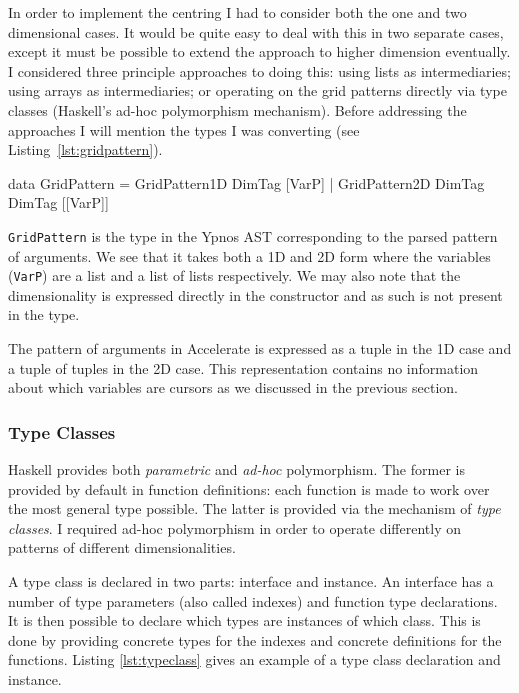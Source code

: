 \documentclass[12pt,a4paper,twoside]{scrbook}
\begin{document}
In order to implement the centring I had to consider both the one and two
dimensional cases.  It would be quite easy to deal with this in two separate
cases, except it must be possible to extend the approach to higher dimension
eventually. I considered three principle approaches to doing this: using lists
as intermediaries; using arrays as intermediaries; or operating on the grid
patterns directly via type classes (Haskell's ad-hoc polymorphism mechanism).
Before addressing the approaches I will mention the types I was converting (see
Listing~\ref{lst:gridpattern}).

\begin{hflisting}[label={lst:gridpattern}, caption=The data type which stores
  the grid patterns in Ypnos. Notice that the dimensionality is not exposed in
  the type.]
data GridPattern =
    GridPattern1D DimTag [VarP] |
    GridPattern2D DimTag DimTag [[VarP]]
\end{hflisting}

\texttt{GridPattern} is the type in the Ypnos AST corresponding to the
parsed pattern of arguments. We see that it takes both a 1D and 2D form
where the variables (\texttt{VarP}) are a list and a list of lists
respectively. We may also note that the dimensionality is expressed
directly in the constructor and as such is not present in the type.

The pattern of arguments in Accelerate is expressed as a tuple in the 1D case
and a tuple of tuples in the 2D case. This representation contains no
information about which variables are cursors as we discussed in the previous
section.

\subsubsection{Type Classes}
\label{sec:typeclasses}

Haskell provides both \emph{parametric} and \emph{ad-hoc} polymorphism. The
former is provided by default in function definitions: each function is made to
work over the most general type possible. The latter is provided via the
mechanism of \emph{type classes}.  I required ad-hoc polymorphism in order to
operate differently on patterns of different dimensionalities.

A type class is declared in two parts: interface and instance. An interface has
a number of type parameters (also called indexes) and function type
declarations. It is then possible to declare which types are instances of which
class. This is done by providing concrete types for the indexes and concrete
definitions for the functions. Listing \ref{lst:typeclass} gives an example of a
type class declaration and instance.
\end{document}
